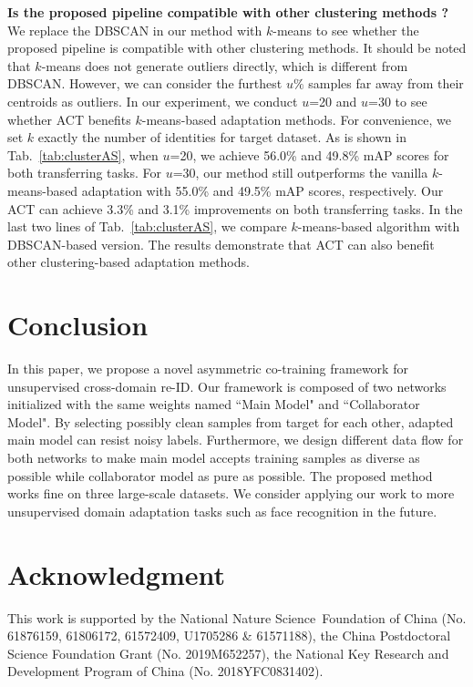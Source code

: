 \documentclass[letterpaper]{article} \usepackage{aaai20}  \usepackage{times}  \usepackage{helvet} \usepackage{courier}  \usepackage[hyphens]{url}  \usepackage{graphicx} \urlstyle{rm} \def\UrlFont{\rm}  \usepackage{graphicx}  \frenchspacing  \setlength{\pdfpagewidth}{8.5in}  \setlength{\pdfpageheight}{11in}  \usepackage{color}
\begin{document}
\textbf{Is the proposed pipeline compatible with other clustering methods ?}
We replace the DBSCAN in our method with $k$-means to see whether the proposed pipeline is compatible with other clustering methods. It should be noted that $k$-means does not generate outliers directly, which is different from DBSCAN. However, we can consider the furthest $u\%$ samples far away from their centroids as outliers. In our experiment, we conduct $u$=20 and $u$=30 to see whether ACT benefits $k$-means-based adaptation methods. For convenience, we set $k$ exactly the number of identities for target dataset. As is shown in Tab.~\ref{tab:clusterAS}, when $u$=20, we achieve 56.0\% and 49.8\% mAP scores for both transferring tasks. For $u$=30, our method still outperforms the vanilla $k$-means-based adaptation with 55.0\% and 49.5\% mAP scores, respectively. Our ACT can achieve 3.3\% and 3.1\% improvements on both transferring tasks. In the last two lines of Tab.~\ref{tab:clusterAS}, we compare $k$-means-based algorithm with DBSCAN-based version. The results demonstrate that ACT can also benefit other clustering-based adaptation methods.



\section{Conclusion}
In this paper, we propose a novel asymmetric co-training framework for unsupervised cross-domain re-ID. Our framework is composed of two networks initialized with the same weights named ``Main Model" and ``Collaborator Model". By selecting possibly clean samples from target for each other, adapted main model can resist noisy labels. Furthermore, we design different data flow for both networks to make main model accepts training samples as diverse as possible while collaborator model as pure as possible. The proposed method works fine on three large-scale datasets. We consider applying our work to more unsupervised domain adaptation tasks such as face recognition in the future.

\section*{Acknowledgment}
This work is supported by the National Nature Science Foundation of China (No. 61876159, 61806172, 61572409, U1705286 \& 61571188), the China Postdoctoral Science Foundation Grant (No. 2019M652257), the National Key Research and Development Program of China (No. 2018YFC0831402). 




\end{document}
